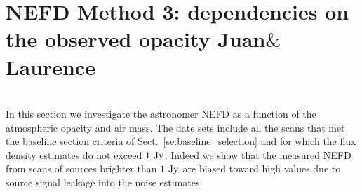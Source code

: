 
\section{NEFD Method 3: dependencies on the observed opacity {\color{blue} Juan$\&$Laurence}}
\label{NEFD_pipeline}


\\

In this section we investigate the astronomer NEFD as a function of
the atmospheric opacity and air mass.            
The date sets include all the scans that met the baseline section
criteria of Sect.~\ref{se:baseline_selection} and for which the flux
density estimates do not exceed $1~\rm{Jy}$. Indeed we show that the
measured NEFD from scans of sources brighter than $1~\rm{Jy}$ are
biased toward high values due to source signal leakage into the noise
estimates.



